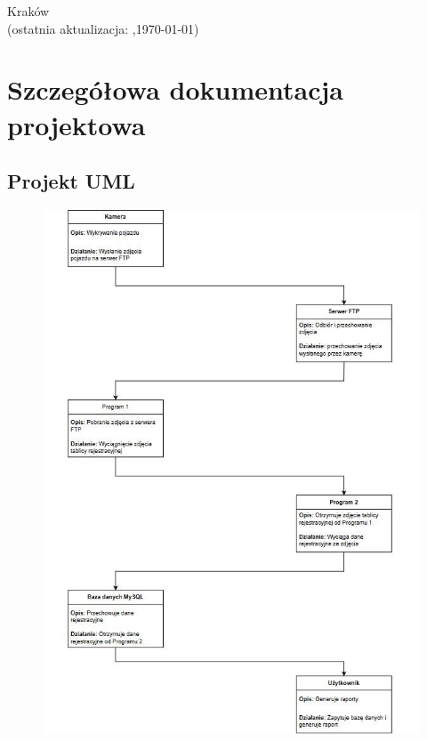 \documentclass[12pt,a4paper,oneside]{article}
\theoremstyle{definition}
\numberwithin{equation}{section}
\begin{document}
\begin{titlepage}
\vspace*{\fill}
\begin{center}
\large
Kraków \the\year\\
(ostatnia aktualizacja: \DTMcurrenttime,\;\today)
\end{center}
\end{titlepage}
\setcounter{page}{0} 
\newpage\null\thispagestyle{empty}

\tableofcontents


\newpage

\section{Szczegółowa dokumentacja projektowa}
\subsection{Projekt UML}
        \begin{figure}[H]
          \includegraphics[width=0.8\linewidth]{dokumentacja_projektowa/images/uml.JPG}
          \label{fig:Generowanie}
        \end{figure}
\end{document}
